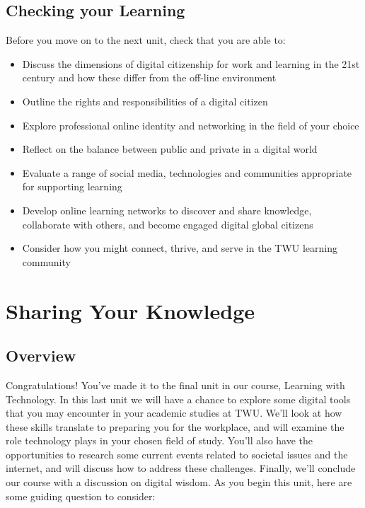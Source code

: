 \documentclass[
]{book}
\providecommand{\tightlist}{%
  \setlength{\itemsep}{0pt}\setlength{\parskip}{0pt}}
\theoremstyle{definition}
\theoremstyle{definition}
\theoremstyle{definition}
\theoremstyle{definition}
\theoremstyle{remark}
\begin{document}
\hypertarget{checking-your-learning-4}{%
\section*{Checking your Learning}\label{checking-your-learning-4}}

\begin{progress}
Before you move on to the next unit, check that you are able to:

\begin{itemize}
\tightlist
\item
  Discuss the dimensions of digital citizenship for work and learning in the 21st century and how these differ from the off-line environment\\
\item
  Outline the rights and responsibilities of a digital citizen\\
\item
  Explore professional online identity and networking in the field of your choice
\item
  Reflect on the balance between public and private in a digital world
\item
  Evaluate a range of social media, technologies and communities appropriate for supporting learning\\
\item
  Develop online learning networks to discover and share knowledge, collaborate with others, and become engaged digital global citizens\\
\item
  Consider how you might connect, thrive, and serve in the TWU learning community
\end{itemize}
\end{progress}

\hypertarget{sharing-your-knowledge}{%
\chapter{Sharing Your Knowledge}\label{sharing-your-knowledge}}

\hypertarget{overview-5}{%
\section*{Overview}\label{overview-5}}

Congratulations! You've made it to the final unit in our course, Learning with Technology. In this last unit we will have a chance to explore some digital tools that you may encounter in your academic studies at TWU. We'll look at how these skills translate to preparing you for the workplace, and will examine the role technology plays in your chosen field of study. You'll also have the opportunities to research some current events related to societal issues and the internet, and will discuss how to address these challenges. Finally, we'll conclude our course with a discussion on digital wisdom. As you begin this unit, here are some guiding question to consider:
\end{document}
